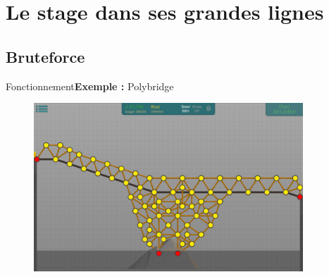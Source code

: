 \section{Le stage dans ses grandes lignes}
\begin{frame}
	\tableofcontents[currentsection]
\end{frame}

	\subsection{Bruteforce}
	\begin{frame}{Fonctionnement}{\textbf{Exemple :} Polybridge}
		\begin{figure}
			\includegraphics[width=0.9\textwidth]{images/polybridge_bruteforce}
		\end{figure}
	\end{frame}
